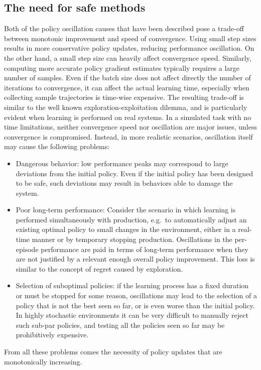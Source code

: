 \subsection{The need for safe methods}
Both of the policy oscillation causes that have been described pose a trade-off between monotonic improvement and speed of convergence. Using small step sizes results in more conservative policy updates, reducing performance oscillation. On the other hand, a small step size can heavily affect convergence speed. Similarly, computing more accurate policy gradient estimates typically requires a large number of samples. Even if the batch size does not affect directly the number of iterations to convergence, it can affect the actual learning time, especially when collecting sample trajectories is time-wise expensive. The resulting trade-off is similar to the well known exploration-exploitation dilemma, and is particularly evident when learning is performed on real systems. In a simulated task with no time limitations, neither convergence speed nor oscillation are major issues, unless convergence is compromised. Instead, in more realistic scenarios, oscillation itself may cause the following problems:
\begin{itemize}
\item Dangerous behavior: low performance peaks may correspond to large deviations from the initial policy. Even if the initial policy has been designed to be safe, such deviations may result in behaviors able to damage the system.
\item Poor long-term performance: Consider the scenario in which learning is performed simultaneously with production, e.g.\ to automatically adjust an existing optimal policy to small changes in the environment, either in a real-time manner or by temporary stopping production. Oscillations in the per-episode performance are paid in terms of long-term performance when they are not justified by a relevant enough overall policy improvement. This loss is similar to the concept of regret caused by exploration.
\item Selection of suboptimal policies: if the learning process has a fixed duration or must be stopped for some reason, oscillations may lead to the selection of a policy that is not the best seen so far, or is even worse than the initial policy. In highly stochastic environments it can be very difficult to manually reject such sub-par policies, and testing all the policies seen so far may be prohibitively expensive.
\end{itemize} 
From all these problems comes the necessity of policy updates that are monotonically increasing.

